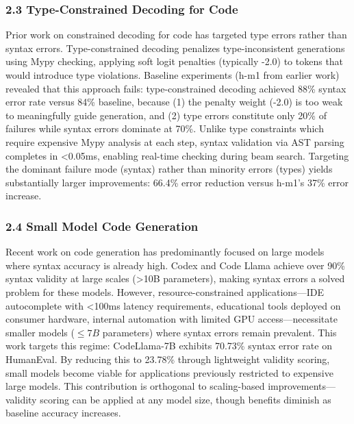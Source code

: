\subsubsection{2.3 Type-Constrained Decoding for Code}

Prior work on constrained decoding for code has targeted type errors rather than syntax errors. Type-constrained decoding penalizes type-inconsistent generations using Mypy checking, applying soft logit penalties (typically -2.0) to tokens that would introduce type violations. Baseline experiments (h-m1 from earlier work) revealed that this approach fails: type-constrained decoding achieved 88\% syntax error rate versus 84\% baseline, because (1) the penalty weight (-2.0) is too weak to meaningfully guide generation, and (2) type errors constitute only 20\% of failures while syntax errors dominate at 70\%. Unlike type constraints which require expensive Mypy analysis at each step, syntax validation via AST parsing completes in <0.05ms, enabling real-time checking during beam search. Targeting the dominant failure mode (syntax) rather than minority errors (types) yields substantially larger improvements: 66.4\% error reduction versus h-m1's 37\% error increase.

\subsubsection{2.4 Small Model Code Generation}

Recent work on code generation has predominantly focused on large models where syntax accuracy is already high. Codex and Code Llama achieve over 90\% syntax validity at large scales (>10B parameters), making syntax errors a solved problem for these models. However, resource-constrained applications---IDE autocomplete with <100ms latency requirements, educational tools deployed on consumer hardware, internal automation with limited GPU access---necessitate smaller models ($\leq 7B$ parameters) where syntax errors remain prevalent. This work targets this regime: CodeLlama-7B exhibits 70.73\% syntax error rate on HumanEval. By reducing this to 23.78\% through lightweight validity scoring, small models become viable for applications previously restricted to expensive large models. This contribution is orthogonal to scaling-based improvements---validity scoring can be applied at any model size, though benefits diminish as baseline accuracy increases.

